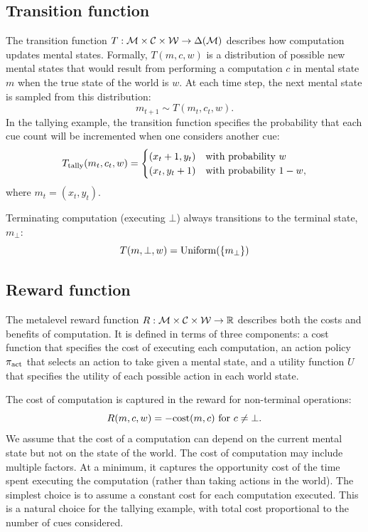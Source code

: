 \subsection{Transition function}
The transition function $T: \mathcal{M} \times \mathcal{C} \times \mathcal{W} \rightarrow \Delta(\mathcal{M})$ describes how computation updates mental states. Formally, $T(m, c, w)$ is a distribution of possible new mental states that would result from performing a computation $c$ in mental state $m$ when the true state of the world is $w$. At each time step, the next mental state is sampled from this distribution:
\begin{equation}\label{eq:transition}
m_{t+1} \sim T(m_t, c_t, w).
\end{equation}
In the tallying example, the transition function specifies the probability that each cue count will be incremented when one considers another cue:
\begin{equation}\label{eq:tally-transition}
  T_{\text{tally}}(m_t, c_t, w) = \begin{cases}
    (x_t + 1, y_t) &\text{with probability } w  \\
    (x_t, y_t + 1) &\text{with probability } 1-w,
  \end{cases}
\end{equation}
where $m_t = (x_t, y_t)$.

Terminating computation (executing $\bot$) always transitions to the terminal state, $m_\bot$:
%
\begin{equation}
  T(m, \bot, w) = \mathrm{Uniform}(\{m_\bot\})
\end{equation}

\subsection{Reward function}
The metalevel reward function $R: \mathcal{M} \times \mathcal{C} \times \mathcal{W} \rightarrow \mathbb{R}$ describes both the costs and benefits of computation. It is defined in terms of three components: a cost function that specifies the cost of executing each computation, an action policy $\pi_{\text{act}}$ that selects an action to take given a mental state, and a utility function $U$ that specifies the utility of each possible action in each world state.

The cost of computation is captured in the reward for non-terminal operations:
%
\begin{equation}
R(m, c, w) = -\text{cost}(m, c) \text{ for } c \neq \bot.
\end{equation}
%
We assume that the cost of a computation can depend on the current mental state but not on the state of the world. The cost of computation may include multiple factors. At a minimum, it captures the opportunity cost of the time spent executing the computation (rather than taking actions in the world). The simplest choice is to assume a constant cost for each computation executed. This is a natural choice for the tallying example, with total cost proportional to the number of cues considered.

